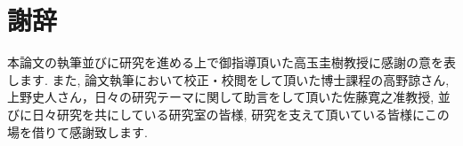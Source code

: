 \documentclass[a4j,11pt]{jarticle}
\begin{document}
\clearpage
\pagestyle{plain}
\section*{謝辞}
本論文の執筆並びに研究を進める上で御指導頂いた高玉圭樹教授に感謝の意を表します. 
また, 論文執筆において校正・校閲をして頂いた博士課程の高野諒さん,上野史人さん，日々の研究テーマに関して助言をして頂いた佐藤寛之准教授, 並びに日々研究を共にしている研究室の皆様, 研究を支えて頂いている皆様にこの場を借りて感謝致します. 

\clearpage
\newpage
{}



\end{document}

